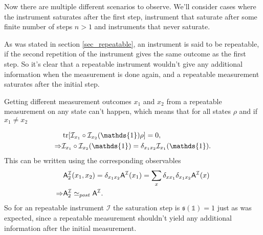 \documentclass[a4paper,12pt]{wihuri}
\theoremstyle{definition}
\numberwithin{definition}{section}
\numberwithin{example}{section}
\numberwithin{theorem}{section}
\numberwithin{proposition}{section}
\numberwithin{lemma}{section}
\newcommand{\I}{\mathcal{I}}%
\newcommand{\A}{\mathsf{A}}%
\newcommand{\id}{\mathds{1}}
\DeclareMathOperator{\tr}{tr}
\newcommand{\sat}{\mathfrak{s}}
\newcommand{\spp}{\simeq_{post}}
\begin{document}
Now there are multiple different scenarios to observe. We'll consider cases where the instrument saturates after the first step, instrument that saturate after some finite number of steps $n > 1$ and instruments that never saturate.


As was stated in section \ref{sec_repeatable}, an instrument is said to be repeatable, if the second repetition of the instrument gives the same outcome as the first step. So it's clear that a repeatable instrument wouldn't give any additional information when the measurement is done again, and a repeatable measurement saturates after the initial step. 

Getting different measurement outcomes $x_1$ and $x_2$ from a repeatable measurement on any state can't happen, which means that for all states $\rho$ and if $x_1 \neq x_2$


\begin{align*}
&\tr[\I_{x_1}\circ\I_{x_2}(\id)\rho] = 0, \\
\Rightarrow &\I_{x_1} \circ \I_{x_2}(\id) = \delta_{x_1 x_2}\I_{x_1}(\id)\text.
\end{align*}
This can be written using the corresponding observables
\begin{align*}
&\A_2^\I(x_1, x_2) = \delta_{x_1 x_2}\A^\I(x_1) = \sum_x \delta_{x x_1}\delta_{x_1 x_2}\A^\I(x)\\
\Rightarrow &\A_2^\I \spp \A^\I\text.
\end{align*}
So for an repeatable instrument $\I$ the saturation step is $\sat(\id) = 1$ just as was expected, since a repeatable measurement shouldn't yield any additional information after the initial measurement.


\end{document}

